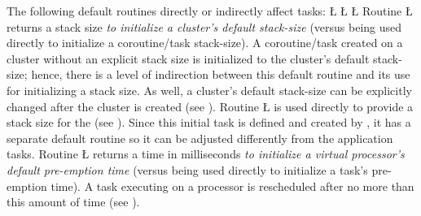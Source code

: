 \documentclass[openright,twoside]{report}
\begin{document}
The following default routines directly or indirectly affect tasks:
\LGinlinefalse\LGbegin\lgrinde
\L{}
\CE{}\L{}
\CE{}\L{}
\CE{}\endlgrinde\LGend
{}%
%
%
%
%
%
%
%
Routine \LGinlinetrue\LGbegin\lgrinde\L{}\endlgrinde\LGend{} returns a stack size \emph{to initialize a cluster's default stack-size} (versus being used directly to initialize a coroutine/task stack-size).
A coroutine/task created on a cluster without an explicit stack size is initialized to the cluster's default stack-size;
hence, there is a level of indirection between this default routine and its use for initializing a stack size.
As well, a cluster's default stack-size can be explicitly changed after the cluster is created (see ).
Routine \LGinlinetrue\LGbegin\lgrinde\L{}\endlgrinde\LGend{} is used directly to provide a stack size for the  (see ).
Since this initial task is defined and created by \uC, it has a separate default routine so it can be adjusted differently from the application tasks.
Routine \LGinlinetrue\LGbegin\lgrinde\L{}\endlgrinde\LGend{} returns a time in milliseconds \emph{to initialize a virtual processor's default pre-emption time} (versus being used directly to initialize a task's pre-emption time).
A task executing on a processor is rescheduled after no more than this amount of time (see ).
\end{document}
